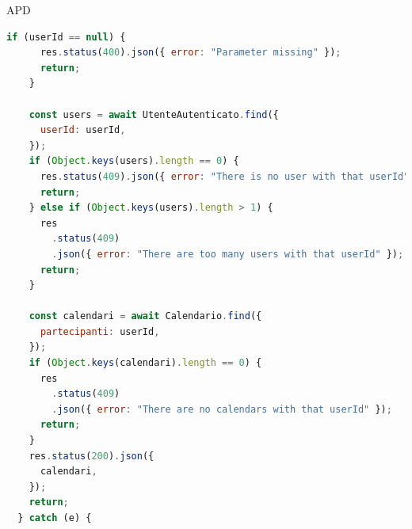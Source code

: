 \begin{listaPersonale} {APD}
\begin{listaPersonale2}[APD]{}
\begin{lstlisting}[language=JavaScript]
    if (userId == null) {
      res.status(400).json({ error: "Parameter missing" });
      return;
    }

    const users = await UtenteAutenticato.find({
      userId: userId,
    });
    if (Object.keys(users).length == 0) {
      res.status(409).json({ error: "There is no user with that userId" });
      return;
    } else if (Object.keys(users).length > 1) {
      res
        .status(409)
        .json({ error: "There are too many users with that userId" });
      return;
    }

    const calendari = await Calendario.find({
      partecipanti: userId,
    });
    if (Object.keys(calendari).length == 0) {
      res
        .status(409)
        .json({ error: "There are no calendars with that userId" });
      return;
    }
    res.status(200).json({
      calendari,
    });
    return;
  } catch (e) {
    

\end{lstlisting}
\end{listaPersonale2}
\end{listaPersonale}
